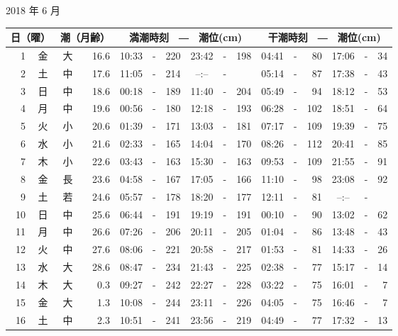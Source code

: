 \documentclass[12pt.a4j]{jsarticle}
\begin{document}
\begin{center}
 {\large 2018 年  6 月}\\
 \begin{table}[ht]
    \begin{tabular}{|rc|cr|ccrccr|ccrccr|}
    \hline
    \multicolumn{2}{|c|}{日（曜）} & \multicolumn{2}{c|}{潮（月齢）} & \multicolumn{6}{c|}{満潮時刻　―　潮位(cm)} & \multicolumn{6}{c|}{干潮時刻　―　潮位(cm)} \\
 \hline
 1 & 金 & 大 & 16.6 &  10:33 &-& 220  &  23:42 &-& 198  &   04:41 &-&  80  &   17:06 &-&  34  \\
 2 & 土 & 中 & 17.6 &  11:05 &-& 214  &  --:-- &-&     &   05:14 &-&  87  &   17:38 &-&  43  \\
 3 & 日 & 中 & 18.6 &  00:18 &-& 189  &  11:40 &-& 204  &   05:49 &-&  94  &   18:12 &-&  53  \\
 4 & 月 & 中 & 19.6 &  00:56 &-& 180  &  12:18 &-& 193  &   06:28 &-& 102  &   18:51 &-&  64  \\
 5 & 火 & 小 & 20.6 &  01:39 &-& 171  &  13:03 &-& 181  &   07:17 &-& 109  &   19:39 &-&  75  \\
 6 & 水 & 小 & 21.6 &  02:33 &-& 165  &  14:04 &-& 170  &   08:26 &-& 112  &   20:41 &-&  85  \\
 7 & 木 & 小 & 22.6 &  03:43 &-& 163  &  15:30 &-& 163  &   09:53 &-& 109  &   21:55 &-&  91  \\
 8 & 金 & 長 & 23.6 &  04:58 &-& 167  &  17:05 &-& 166  &   11:10 &-&  98  &   23:08 &-&  92  \\
 9 & 土 & 若 & 24.6 &  05:57 &-& 178  &  18:20 &-& 177  &   12:11 &-&  81  &   --:-- &-&     \\
10 & 日 & 中 & 25.6 &  06:44 &-& 191  &  19:19 &-& 191  &   00:10 &-&  90  &   13:02 &-&  62  \\
11 & 月 & 中 & 26.6 &  07:26 &-& 206  &  20:11 &-& 205  &   01:04 &-&  86  &   13:48 &-&  43  \\
12 & 火 & 中 & 27.6 &  08:06 &-& 221  &  20:58 &-& 217  &   01:53 &-&  81  &   14:33 &-&  26  \\
13 & 水 & 大 & 28.6 &  08:47 &-& 234  &  21:43 &-& 225  &   02:38 &-&  77  &   15:17 &-&  14  \\
14 & 木 & 大 &  0.3 &  09:27 &-& 242  &  22:27 &-& 228  &   03:22 &-&  75  &   16:01 &-&   7  \\
15 & 金 & 大 &  1.3 &  10:08 &-& 244  &  23:11 &-& 226  &   04:05 &-&  75  &   16:46 &-&   7  \\
16 & 土 & 中 &  2.3 &  10:51 &-& 241  &  23:56 &-& 219  &   04:49 &-&  77  &   17:32 &-&  13  \\

\end{tabular}
\end{table}
\end{center}
\end{document}
